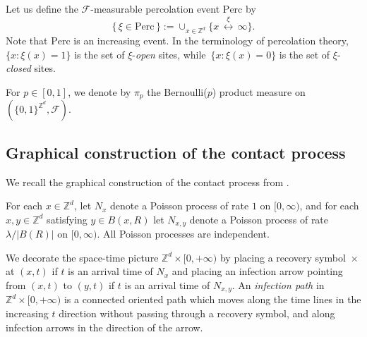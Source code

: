 \documentclass[a4paper,12pt]{article}
\newcommand{\Z}{\mathbb{Z}}
\begin{document}
\smallskip

Let us define the $\mathcal{F}$-measurable percolation event $\mathrm{Perc}$ by
\begin{equation}\label{perc_def_eq}
 \{\, \xi \in \mathrm{Perc} \, \} := \cup_{x \in \mathbb{Z}^d } \{ x \, \stackrel{\xi}{\longleftrightarrow} \, \infty \}.
\end{equation}
Note that $\mathrm{Perc}$ is an increasing event. In the terminology of percolation theory,~$\{x: \xi(x)=1\}$ is the set of $\xi$-\emph{open} sites, while~$\{x: \xi(x)=0\}$ is the set of $\xi$-\emph{closed} sites.





\smallskip

For $p \in [0,1]$, we denote by $\pi_p$ the Bernoulli($p$) product measure on $(\{0,1\}^{\Z^d},\mathcal{F})$.






\subsection{Graphical construction of the contact process}
\label{subsection_graphical_constr_of_cont_proc}



We recall the graphical construction of the contact process from \cite[Part I., Section 1]{Li99}. 

\smallskip

For each $x \in \mathbb{Z}^d$, let $N_x$
denote a Poisson process of rate $1$ on $[0,\infty)$,  and for each $x,y \in \mathbb{Z}^d$ satisfying $y \in B(x,R)$ let $N_{x,y}$
denote a Poisson process of rate $\lambda/|B(R)|$ on $[0,\infty)$.
 All Poisson processes are independent.

\smallskip

  We decorate the space-time picture $\mathbb{Z}^d \times [0,+\infty)$ by placing a recovery symbol~$\times$ at $(x,t)$ if
 $t$ is an arrival time of $N_x$ and placing an infection arrow pointing from $(x,t)$ to $(y,t)$ if $t$ is an arrival time of $N_{x,y}$.
 An \emph{infection path} in  $\mathbb{Z}^d \times [0,+\infty)$ is a connected oriented path which moves along
the time lines in the increasing $t$ direction without passing through a recovery
symbol, and along infection arrows in the direction of the arrow.
\end{document}
